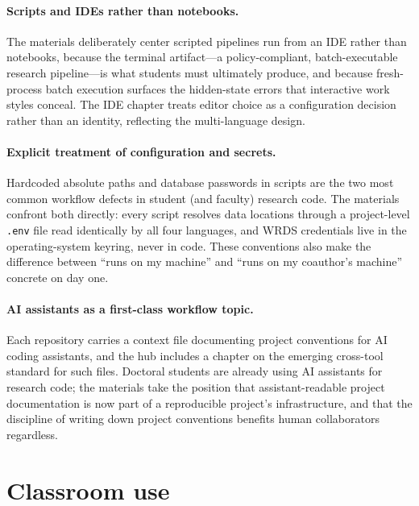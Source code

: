 \documentclass[12pt]{article}
\begin{document}
\paragraph{Scripts and IDEs rather than notebooks.}
The materials deliberately center scripted pipelines run from an IDE
rather than notebooks, because the terminal artifact---a
policy-compliant, batch-executable research pipeline---is what students
must ultimately produce, and because fresh-process batch execution
surfaces the hidden-state errors that interactive work styles conceal.
The IDE chapter treats editor choice as a configuration decision rather
than an identity, reflecting the multi-language design.

\paragraph{Explicit treatment of configuration and secrets.}
Hardcoded absolute paths and database passwords in scripts are the two
most common workflow defects in student (and faculty) research code. The
materials confront both directly: every script resolves data locations
through a project-level \texttt{.env} file read identically by all four
languages, and WRDS credentials live in the operating-system keyring,
never in code. These conventions also make the difference between ``runs
on my machine'' and ``runs on my coauthor's machine'' concrete on day
one.

\paragraph{AI assistants as a first-class workflow topic.}
Each repository carries a context file documenting project conventions
for AI coding assistants, and the hub includes a chapter on the emerging
cross-tool standard for such files. Doctoral students are already using
AI assistants for research code; the materials take the position that
assistant-readable project documentation is now part of a reproducible
project's infrastructure, and that the discipline of writing down project
conventions benefits human collaborators regardless.

\section{Classroom use}
\label{sec:classroom}
\end{document}
